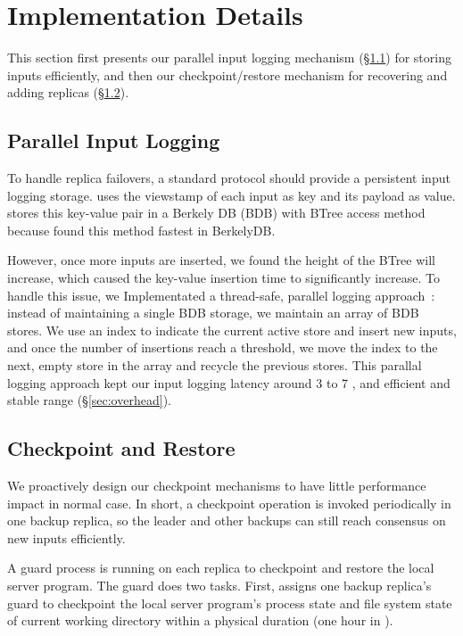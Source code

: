 \section{Implementation Details} \label{sec:impl}

This section first presents our parallel input logging mechanism 
(\S\ref{sec:logging}) for storing inputs efficiently, and then our 
checkpoint/restore mechanism for recovering and adding replicas 
(\S\ref{sec:checkpoint}).

\subsection{Parallel Input Logging} \label{sec:logging}

To handle replica failovers, a standard \paxos protocol should provide a 
persistent input logging storage. \xxx uses the \paxos viewstamp of each input 
as key and its payload as value. \xxx stores this key-value pair in a Berkely 
DB (BDB) with BTree access method~\cite{berkeleydb} because found this method 
fastest in BerkelyDB.

However, once more inputs are inserted, we found the height of the BTree 
will increase, which caused the key-value insertion time to significantly 
increase. To handle this issue, we Implementated a thread-safe, parallel 
logging approach~\cite{para-log:atc10}: instead of maintaining a single BDB 
storage, we maintain an array of BDB stores. We use an index to indicate the 
current active store and insert new inputs, and once the number of insertions 
reach a threshold, we move the index to the next, empty store in the array and 
recycle the previous stores. This parallal logging approach kept our input 
logging latency around 3 to 7 \us, and efficient and stable range 
(\S\ref{sec:overhead}).

\subsection{Checkpoint and Restore} \label{sec:checkpoint}

We proactively design our checkpoint mechanisms to have little performance 
impact in normal case. In short, a checkpoint operation is invoked periodically 
in one backup replica, so the leader and other backups can still reach 
consensus on new inputs efficiently.

A guard process is running on each replica to checkpoint and restore the local 
server program. The guard does two tasks. First, \xxx assigns one backup 
replica's guard to checkpoint the local server program's process state and file 
system state of current working directory within a physical duration 
\tcheckpoint (one hour in \xxx).

